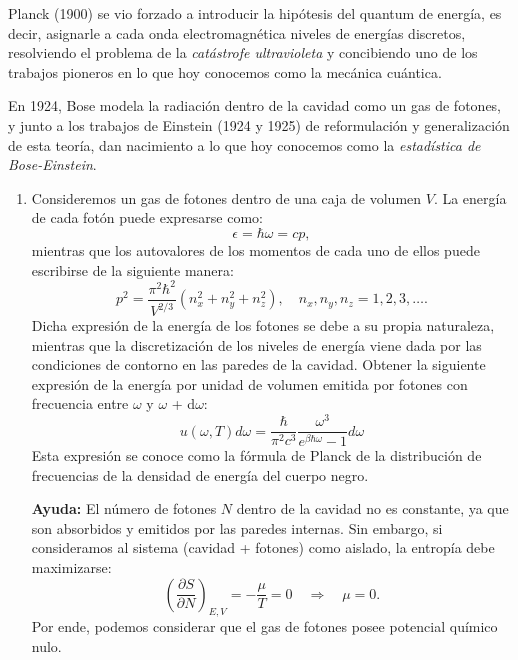 \documentclass[a4paper,11pt]{article}
\begin{document}
Planck (1900) se vio forzado a introducir la hipótesis del quantum de
energía, es decir, asignarle a cada onda electromagnética niveles de
energías discretos, resolviendo el problema de la \emph{catástrofe
ultravioleta} y concibiendo uno de los trabajos pioneros en lo que hoy
conocemos como la mecánica cuántica.

En 1924, Bose modela la radiación dentro de la cavidad como un gas de
fotones, y junto a los trabajos de Einstein (1924 y 1925) de reformulación y
generalización de esta teoría, dan nacimiento a lo que hoy conocemos como la
\emph{estadística de Bose-Einstein}.


\begin{enumerate}[label=(\alph*),
                  leftmargin=2\parindent,
                  rightmargin=2\parindent]

     \item{Consideremos un gas de fotones dentro de una caja de volumen $V$.
           La energía de cada fotón puede expresarse como:
           $$ \epsilon = \hbar \omega = c p , $$
           mientras que los autovalores de los momentos de cada uno de ellos
           puede escribirse de la siguiente manera:
           $$
           p^2 = \frac{\pi^2 \hbar^2}{V^{2/3}}
           \left( n_x^2 + n_y^2 + n_z^2 \right), \quad
           n_x, n_y, n_z = 1, 2, 3, \dots .
           $$
           Dicha expresión de la energía de los fotones se debe a su propia
           naturaleza, mientras que la discretización de los niveles de
           energía viene dada por las condiciones de contorno en las paredes
           de la cavidad.
           Obtener la siguiente expresión de  la energía por unidad de volumen
           emitida por fotones con frecuencia entre $\omega$ y $\omega$ +
           d$\omega$:
           $$
           u(\omega, T)d\omega = \frac{\hbar}{\pi^2 c^3}
           \frac{\omega^3}{e^{\beta \hbar \omega} - 1} d\omega
           $$
           Esta expresión se conoce como la fórmula de Planck de la
           distribución de frecuencias de la densidad de energía del cuerpo
           negro.
           }

     {\small
     \textbf{Ayuda:}
     El número de fotones $N$ dentro de la cavidad no es constante, ya que
     son absorbidos y emitidos por las paredes internas.
     Sin embargo, si consideramos al sistema (cavidad + fotones) como aislado,
     la entropía debe maximizarse:
     $$
     \left( \frac{\partial S}{\partial N} \right)_{E, V} =
     - \frac{\mu}{T} = 0 \quad \Rightarrow \quad \mu = 0.
     $$
     Por ende, podemos considerar que el gas de fotones posee potencial
     químico nulo.
     }


\end{enumerate}
\end{document}

